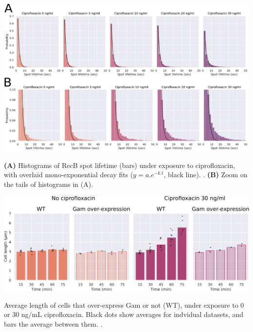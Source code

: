 \begin{suppfigure*}[htbp]
    \begin{center}
    \includegraphics[width=\linewidth]{SI_Figures/Monoexp_fits_cipro.pdf}
    \end{center}
    \caption{\textbf{(A)} Histograms of RecB spot lifetime (bars) under exposure to ciprofloxacin, with overlaid mono-exponential decay fits ($y=a.e^{-k.t}$, black line). .  \textbf{(B)} Zoom on the tails of histograms in (A).}
    \label{SIFig:monoexp_fits}
\end{suppfigure*}

\begin{suppfigure*}[htbp]
    \begin{center}
    \includegraphics[width=\linewidth]{SI_Figures/Cell_length_Gam.pdf}
    \end{center}
    \caption{Average length of cells that over-express Gam or not (WT), under exposure to 0 or 30 ng/mL ciprofloxacin. Black dots show averages for indvidual datasets, and bars the average between them. .}
    \label{SIFig:Gam_cell_length}
\end{suppfigure*}


